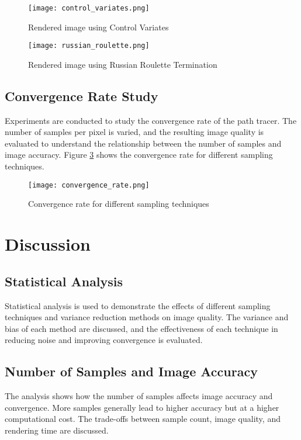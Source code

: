 \documentclass[12pt]{article}
\begin{document}
\begin{figure}[h]
    \centering
    \texttt{[image: control\_variates.png]}
    \caption{Rendered image using Control Variates}
    \label{fig:control_variates}
\end{figure}

\begin{figure}[h]
    \centering
    \texttt{[image: russian\_roulette.png]}
    \caption{Rendered image using Russian Roulette Termination}
    \label{fig:russian_roulette}
\end{figure}

\subsection{Convergence Rate Study}
Experiments are conducted to study the convergence rate of the path tracer. The number of samples per pixel is varied, and the resulting image quality is evaluated to understand the relationship between the number of samples and image accuracy. Figure \ref{fig:convergence_rate} shows the convergence rate for different sampling techniques.

\begin{figure}[h]
    \centering
    \texttt{[image: convergence\_rate.png]}
    \caption{Convergence rate for different sampling techniques}
    \label{fig:convergence_rate}
\end{figure}

\section{Discussion}
\label{sec:discussion}
\subsection{Statistical Analysis}
Statistical analysis is used to demonstrate the effects of different sampling techniques and variance reduction methods on image quality. The variance and bias of each method are discussed, and the effectiveness of each technique in reducing noise and improving convergence is evaluated.

\subsection{Number of Samples and Image Accuracy}
The analysis shows how the number of samples affects image accuracy and convergence. More samples generally lead to higher accuracy but at a higher computational cost. The trade-offs between sample count, image quality, and rendering time are discussed.
\end{document}
